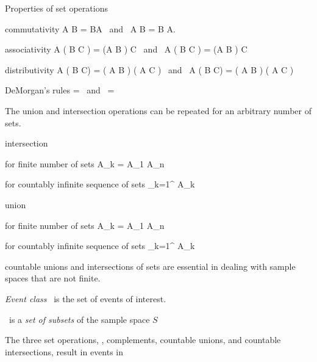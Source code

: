 	\item Properties of set operations
	\bit
		\item commutativity
		\beq
			A \cup B = B\cup A \mbox{ and }  A \cap B = B \cap A.
		\eeq

		\item associativity
		\beq
			A \cup ( B \cup C ) = (A \cup B ) \cup C
			\mbox{ and }
			A \cap ( B \cap C ) = (A \cap B ) \cap C
		\eeq

		\item distributivity
		\beq
			A \cup ( B \cap C) = ( A \cup B ) \cap ( A \cup C )
			\mbox{ and }
			A \cap ( B \cup C) = ( A \cap B ) \cup ( A \cap C )
		\eeq
	\eit

	\item DeMorgan's rules
		\beq
			 =  \cap \comp{B}
			\mbox{ and }
			 =  \cup \comp{B}
		\eeq

	\item \lgexam{2.7}{}


	\item The union and intersection operations can be repeated
		for an arbitrary number of sets.
		\bit
		\item intersection
			\bit
			\item for finite number of sets
				\beq
					\bigcapkton A_k = A_1 \cap \cdots \cap A_n
				\eeq
			\item for countably infinite sequence of sets
				\beq
					\bigcap_{k=1}^{\infty} A_k
				\eeq
			\eit
		\item union
			\bit
			\item for finite number of sets
				\beq
					\bigcupkton A_k = A_1 \cup \cdots \cup A_n
				\eeq
			\item for countably infinite sequence of sets
				\beq
					\bigcup_{k=1}^{\infty} A_k
				\eeq
			\eit
		\eit

	\item countable unions and intersections of sets are essential in dealing with sample spaces that are not finite.

	\item \emph{Event class} \evcl\ is the set of events of interest.
	\bit
		\item \evcl\ is a \emph{set of subsets} of the sample space $S$
		\item The three set operations, \ie, complements, countable unions, and countable intersections,
		result in events in \evcl


